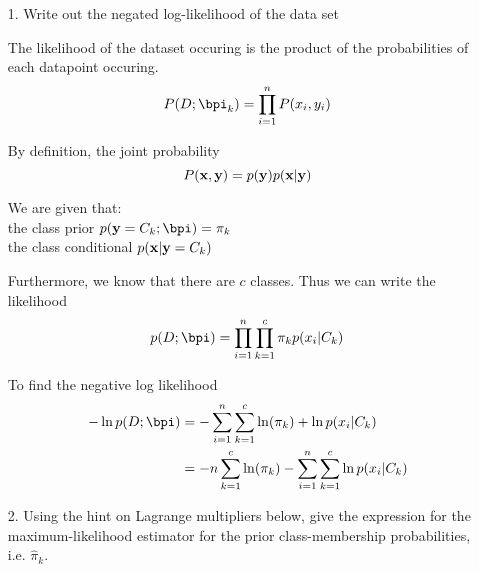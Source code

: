 \documentclass[submit]{harvardml}
\newenvironment{answer}{%
    \color{answergreen}\bf}
  {%
  }
\begin{document}
\begin{enumerate}
    \item[1.] Write out the negated log-likelihood of the data set

    \begin{answer}

        The likelihood of the dataset occuring is the product of the
        probabilities of each datapoint occuring.
        $$P(D;\bpi_k) = \prod_{i=1}^n P(x_i, y_i)$$

        By definition, the joint probability
        $$P(\mathbf{x},\mathbf{y}) = p(\mathbf{y}) p(\mathbf{x}|\mathbf{y})$$


        We are given that:  \\
        the class prior $p(\by=C_k; \bpi) = \pi_k$  \\
        the class conditional $p(\mathbf{x}|\mathbf{y} = C_k)$ 

        Furthermore, we know that there are $c$ classes.  Thus we can write the likelihood 
        $$p(D; \bpi) = \prod_{i=1}^n \prod_{k=1}^c \pi_k p(x_i | C_k)$$
       
        To find the negative log likelihood 
        \begin{align*}
            - \ln p(D; \bpi) &= - \sum_{i=1}^n \sum_{k=1}^c \ln(\pi_k) + \ln p(x_i|C_k) \\ 
                &= - n \sum_{k=1}^c \ln(\pi_k) - \sum_{i=1}^n \sum_{k=1}^c \ln p(x_i|C_k) \\
        \end{align*}
    \end{answer}

    \item[2.]  Using the hint on Lagrange multipliers below, give the
    expression for the maximum-likelihood estimator for the prior
    class-membership probabilities, i.e.  $\hat \pi_k.$

    \begin{answer}


\end{answer}
\end{enumerate}
\end{document}
